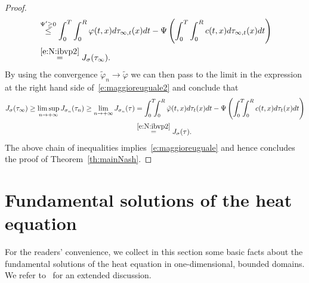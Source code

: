 \documentclass[11pt,leqno]{amsart}
\numberwithin{equation}{section}
\begin{document}
\begin{proof}
\begin{equation}
\begin{split}
  &  \stackrel{\Psi' \ge 0}{\leq}
     \int_0^T \int_0^R 
   {\varphi} (t, x) d \tau_{\infty,t} (x) dt -
    \Psi \left( 
    \int_0^T \int_0^R 
    c (t, x) d \tau_{\infty,t}(x) dt \right) \\
    & \stackrel{\eqref{e:N:ibvp2}}{=}
    J_\sigma (\tau_\infty). 
    \end{split}
\end{equation}
By using the convergence $\tilde {\varphi}_n \to \tilde {\varphi}$ we can then pass to the limit
in the expression at the right hand side of~\eqref{e:maggioreuguale2} 
and conclude that 
\begin{equation*}
\begin{split}
  J_\sigma (\tau_\infty) 
  \ge  \limsup_{n \to + \infty} J_{\sigma_n} (\tau_n)
   \ge \lim_{n \to + \infty} J_{\sigma_n} (\tau) & =
   \int_0^T \! \! \! \int_0^R 
   \tilde  {\varphi} (t, x) d \tau_t (x) dt - \Psi \left( 
    \int_0^T \! \! \! \int_0^R 
    c (t, x) d \tau_t(x) dt \right) \\
    & \stackrel{\eqref{e:N:ibvp2}}{=}  J_\sigma (\tau).
    \end{split}
\end{equation*}
The above chain of inequalities implies~\eqref{e:maggioreuguale} and hence concludes the proof
of Theorem~\ref{th:mainNash}. 
\end{proof}
\appendix
\section{Fundamental solutions of the heat equation}
For the readers' convenience, we collect in this section some basic facts about the fundamental solutions of the heat equation in one-dimensional, bounded domains. We refer to~\cite{Cannon} for an extended discussion.   
\end{document}
